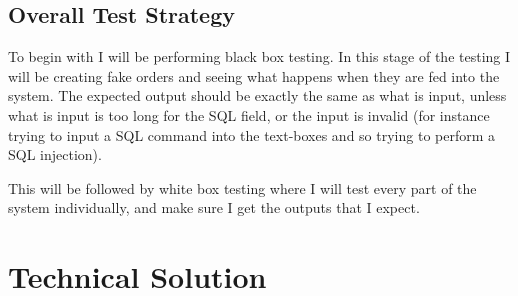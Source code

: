 \documentclass[
11pt, %
a4paper, %
oneside, %
headinclude,footinclude, %
BCOR5mm, %
]{scrartcl}
\begin{document}
\subsection{Overall Test Strategy}
To begin with I will be performing black box testing. In this stage of the testing I will be creating fake orders and seeing what happens when they are fed into the system. The expected output should be exactly the same as what is input, unless what is input is too long for the SQL field, or the input is invalid (for instance trying to input a SQL command into the text-boxes and so trying to perform a SQL injection).\par This will be followed by white box testing where I will test every part of the system individually, and make sure I get the outputs that I expect.





\section{Technical Solution}




\renewcommand{\refname}{\spacedlowsmallcaps{References}} %




\end{document}
